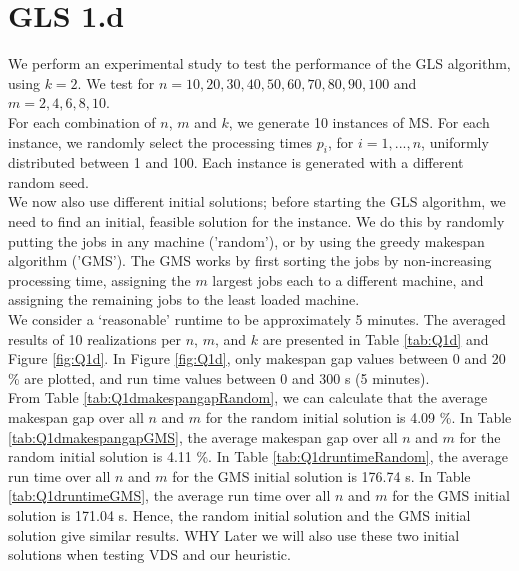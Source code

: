 \documentclass[12pt,a4paper,reqno]{article}
\begin{document}
\section*{GLS 1.d}
We perform an experimental study to test the performance of the GLS algorithm, using $k=2$. We test for $n=10,20,30,40,50,60,70,80,90,100$ and $m=2,4,6,8,10$. \\

For each combination of $n$, $m$ and $k$, we generate 10 instances of MS. For each instance, we randomly select the processing times $p_i$, for $i=1,...,n$, uniformly distributed between 1 and 100. Each instance is generated with a different random seed. \\

We now also use different initial solutions; before starting the GLS algorithm, we need to find an initial, feasible solution for the instance. We do this by randomly putting the jobs in any machine ('random'), or by using the greedy makespan algorithm ('GMS'). The GMS works by first sorting the jobs by non-increasing processing time, assigning the $m$ largest jobs each to a different machine, and assigning the remaining jobs to the least loaded machine. \\

We consider a `reasonable' runtime to be approximately 5 minutes. The averaged results of 10 realizations per $n$, $m$, and $k$ are presented in Table \ref{tab:Q1d} and Figure \ref{fig:Q1d}. In Figure \ref{fig:Q1d}, only makespan gap values between 0 and 20 \% are plotted, and run time values between 0 and 300 s (5 minutes). \\

From Table \ref{tab:Q1dmakespangapRandom}, we can calculate that the average makespan gap over all $n$ and $m$ for the random initial solution is 4.09 \%. In Table \ref{tab:Q1dmakespangapGMS}, the average makespan gap over all $n$ and $m$ for the random initial solution is 4.11 \%. In Table \ref{tab:Q1druntimeRandom}, the average run time over all $n$ and $m$ for the GMS initial solution is 176.74 s. In Table \ref{tab:Q1druntimeGMS}, the average run time over all $n$ and $m$ for the GMS initial solution is 171.04 s. Hence, the random initial solution and the GMS initial solution give similar results. \color{red} WHY \color{black} Later we will also use these two initial solutions when testing VDS and our heuristic.
\end{document}
